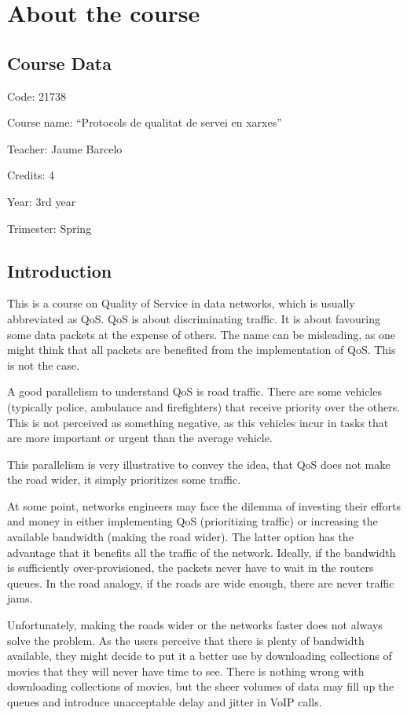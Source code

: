 \chapter{About the course}

\section{Course Data}

Code: 21738

Course name: ``Protocols de qualitat de servei en xarxes''

Teacher: Jaume Barcelo

Credits: 4

Year: 3rd year

Trimester: Spring

\section{Introduction}
This is a course on Quality of Service in data networks, which is usually abbreviated as QoS.
QoS is about discriminating traffic.
It is about favouring some data packets at the expense of others.
The name can be misleading, as one might think that all packets are benefited from the implementation of QoS.
This is not the case.

A good parallelism to understand QoS is road traffic.
There are some vehicles (typically police, ambulance and firefighters) that receive priority over the others. 
This is not perceived as something negative, as this vehicles incur in tasks that are more important or urgent than the average vehicle.

This parallelism is very illustrative to convey the idea, that QoS does not make the road wider, it simply prioritizes some traffic.

At some point, networks engineers may face the dilemma of investing their efforts and money in either implementing QoS (prioritizing traffic) or increasing the available bandwidth (making the road wider).
The latter option has the advantage that it benefits all the traffic of the network.
Ideally, if the bandwidth is sufficiently over-provisioned, the packets never have to wait in the routers queues.
In the road analogy, if the roads are wide enough, there are never traffic jams.

Unfortunately, making the roads wider or the networks faster does not always solve the problem.
As the users perceive that there is plenty of bandwidth available, they might decide to put it a better use by downloading collections of movies that they will never have time to see.
There is nothing wrong with downloading collections of movies, but the sheer volumes of data may fill up the queues and introduce unacceptable delay and jitter in VoIP calls.

